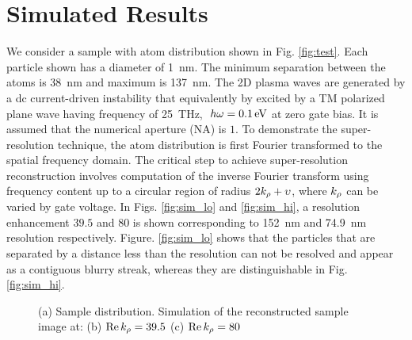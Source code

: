 \documentclass[11pt]{article}
\begin{document}
\section{Simulated Results}
%
We consider a sample with atom distribution shown in Fig. \ref{fig:test}. Each particle shown has a diameter of \SI{1}{\nm}. The minimum separation between the atoms is \SI{38}{\nm} and maximum is \SI{137}{\nm}. The 2D plasma waves are generated by a dc current-driven instability that equivalently by excited by a TM polarized plane wave having frequency of \SI{25}{\THz}, $~h\omega = \SI{.1}{\electronvolt}$ at zero gate bias. It is assumed that the numerical aperture (NA) is $1$. To demonstrate the super-resolution technique, the atom distribution is first Fourier transformed to the spatial frequency domain. The critical step to achieve super-resolution reconstruction involves computation of the inverse Fourier transform using frequency content up to a circular region of radius $2k_{\rho} + \upsilon$, where $k_{\rho}$ can be varied by gate voltage. In Figs. \ref{fig:sim_lo} and \ref{fig:sim_hi}, a resolution enhancement $39.5$ and $80$ is shown corresponding to \SI{152}{\nm} and \SI{74.9}{\nm} resolution respectively.
Figure. \ref{fig:sim_lo} shows that the particles that are separated by a distance less than the resolution can not be resolved and appear as a contiguous blurry streak, whereas they are distinguishable in Fig. \ref{fig:sim_hi}.
%
%
\begin{figure}[t!]
   \hfil
   \hfil
  \caption{(a) Sample distribution. Simulation of the reconstructed sample image at: (b) $\Re k_{\rho} = 39.5$ (c) $\Re k_{\rho} = 80$}
  \label{fig:simulation}
\end{figure}
\end{document}
